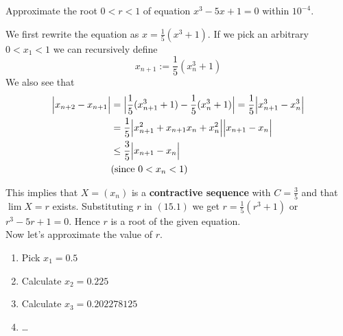 \documentclass[boxes, qed]{homework}
\DeclarePairedDelimiter\abs{\lvert}{\rvert}
\begin{document}
\newenvironment{amatrix}[1]{%
  \left[\begin{array}{@{}*{#1}{c}|c@{}}
}{%
  \end{array}\right]
}

\newenvironment{augmatrix}[1]{%
  \left[\begin{array}{#1}
}{%
  \end{array}\right]
}
\begin{problem}Approximate the root $0<r<1$ of equation
  $x^3-5x+1=0$ within $10^{-4}$.
\end{problem}
\begin{solution}We first rewrite the equation as $x=\frac{1}{5}(x^3+1)$.
  If we pick an arbitrary $0<x_1<1$ we can recursively define
  \begin{equation}
    x_{n+1}:=\frac{1}{5}(x_n^3+1)
  \end{equation}
  We also see that
  \begin{align*}
    \abs[\Big]{x_{n+2}-x_{n+1}}
      &=\abs[\Big]{
        \frac{1}{5}(x_{n+1}^3+1)
        -\frac{1}{5}(x_{n}^3+1)
      }
      =\frac{1}{5}
      \abs[\Big]{x_{n+1}^3 - x_{n}^3}\\
      &=\frac{1}{5}
      \abs[\Big]{x_{n+1}^2 + x_{n+1}x_{n} + x_{n}^2}
      \abs[\Big]{x_{n+1}- x_{n}}\\
      &\le\frac{3}{5}\abs[\Big]{x_{n+1}- x_{n}}\\
      &\text{(since $0<x_n<1$)}
  \end{align*}

  This implies that $X=(x_n)$ is a \textbf{contractive sequence} with $C=\frac{3}{5}$
  and that $\lim{X}=r$ exists. Substituting $r$ in $(15.1)$ we get
  $r=\frac{1}{5}(r^3+1)$ or $r^3-5r+1=0$. Hence $r$ is a root of the given equation.\\

  Now let's approximate the value of $r$. 
  \begin{enumerate}
    \item Pick $x_1=0.5$
    \item Calculate $x_2=0.225$
    \item Calculate $x_3=0.202278125$
    \item \dots
  \end{enumerate}
  

\end{solution}
\end{document}
